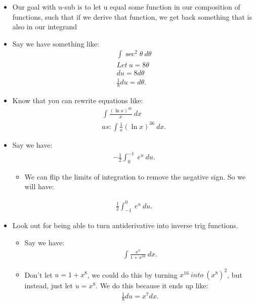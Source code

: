 \documentclass{report}
\begin{document}
      \begin{itemize}
       \item Our goal with u-sub is to let u equal some function in our composition of functions, such that if we derive that function, we get back something that is also in our integrand
        \item Say we have something like:
          \begin{align*}
            \int \sec^{2}{\theta }\ d\theta  \\ 
            Let\ u = 8\theta  \\
            du = 8d\theta  \\
            \frac{1}{8}du = d\theta 
          .\end{align*}
        \item Know that you can rewrite equations like:
          \begin{align*}
            \int \frac{(\ln{x})^{36}}{x}\ dx \\
            as: \int \frac{1}{x}(\ln{x})^{36}\ dx
          .\end{align*}
        \item Say we have:
          \begin{align*}
            -\frac{1}{2} \int_{0}^{-1}\ e^{u}\ du
          .\end{align*}
          \begin{itemize}
            \item We can flip the limits of integration to remove the negative sign. So we will have:
          \end{itemize}
            \begin{align*}
              \frac{1}{2}\int_{-1}^{0}\ e^{u}\ du
            .\end{align*}
          \item Look out for being able to turn antiderivative into inverse trig functions.
            \begin{itemize}
              \item Say we have:
            \begin{align*}
              \int \frac{x^{7}}{1+x^{16}}\ dx
            .\end{align*}
          \item Don't let $u=1+x^{8} $, we could do this by turning $x^{16}\ into\ (x^{8})^{2}$, but instead, just let $u=x^{8}$. We do this because it ends up like:
            \begin{align*}
             \frac{1}{8}du = x^{7}dx  
            .\end{align*}

\end{itemize}
\end{itemize}
\end{document}
